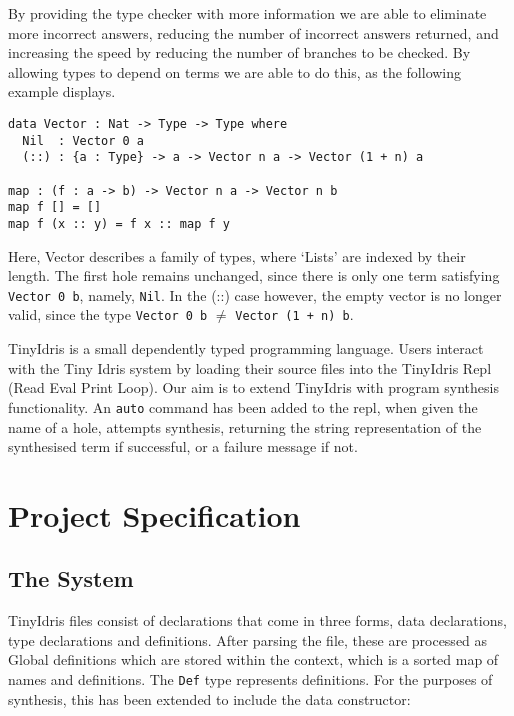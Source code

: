 \documentclass[a4paper]{article}
\begin{document}
By providing the type checker with more information we are able to eliminate more incorrect answers, 
reducing the number of incorrect answers returned, and increasing the speed by reducing the number of branches to be checked. 
By allowing types to depend on terms we are able to do this, as the following example displays.

\begin{center}
\begin{verbatim}
data Vector : Nat -> Type -> Type where
  Nil  : Vector 0 a
  (::) : {a : Type} -> a -> Vector n a -> Vector (1 + n) a

map : (f : a -> b) -> Vector n a -> Vector n b
map f [] = []
map f (x :: y) = f x :: map f y
\end{verbatim}
\end{center}

Here, Vector describes a family of types, where `Lists' are indexed by their length. The first hole remains unchanged, since there 
is only one term satisfying \texttt{Vector 0 b}, namely, \texttt{Nil}. In the (::) case however, the empty vector is no longer valid,
since the type \texttt{Vector 0 b} \(\neq\) \texttt{Vector (1 + n) b}. 

TinyIdris is a small dependently typed programming language.
Users interact with the Tiny Idris system by loading their source files into the TinyIdris Repl (Read Eval Print Loop).
Our aim is to extend TinyIdris with program synthesis functionality. An \texttt{auto} command has been added to the repl, when 
given the name of a hole, attempts synthesis, returning the string representation of the synthesised term if successful, or a failure message if not.

\clearpage

\section{Project Specification}
\label{sec:org56e7fcd}
\subsection{The System}
\label{sec:org3506169}

TinyIdris files consist of declarations that come in three forms, data declarations, type declarations and definitions.
After parsing the file, these are processed as Global definitions which are stored within the 
context, which is a sorted map of names and definitions. The \texttt{Def} type represents definitions. For the purposes of synthesis,
this has been extended to include the data constructor:
\end{document}
